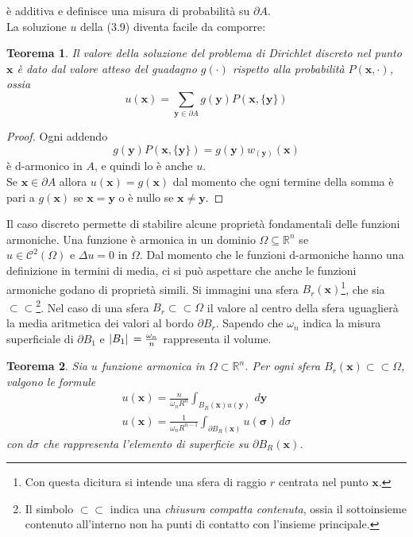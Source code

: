 \documentclass[a4paper,12pt, draft]{article}
\theoremstyle{break}
\newtheorem{theorem}{Teorema}[section]
\numberwithin{equation}{section}
\begin{document}
è additiva e definisce una misura di probabilità su \(\partial A\). \\
La soluzione \(u\) della (3.9) diventa facile da comporre:
\begin{theorem}
  Il valore della soluzione del problema di Dirichlet discreto nel punto \(\bm{x}\) è dato dal valore atteso del guadagno \(g(\cdot)\) rispetto alla probabilità \(P(\bm{x}, \cdot)\), ossia 
  \begin{equation}
    u(\bm{x}) = \sum_{\bm{y}\in \partial A} g(\bm{y})P(\bm{x}, \{\bm{y}\})
  \end{equation}
\end{theorem}
\begin{proof}
  Ogni addendo
  \[
  g(\bm{y})P(\bm{x}, \{\bm{y}\}) = g(\bm{y}) w_{(\bm{y})}(\bm{x})
  \]
  è d-armonico in \(A\), e quindi lo è anche \(u\). \\
  Se \(\bm{x} \in \partial A\) allora \(u(\bm{x}) = g(\bm{x})\) dal momento che ogni termine della somma è pari a \(g(\bm{x})\) se \(\bm{x} = \bm{y}\) o è nullo se \(\bm{x} \not = \bm{y}\).
\end{proof}
Il caso discreto permette di stabilire alcune proprietà fondamentali delle funzioni armoniche. Una funzione è armonica in un dominio \(\Omega \subseteq \mathbb{R}^n\) se \(u \in \mathcal{C}^2(\Omega) \mbox{ e }\Delta u = 0 \mbox{ in } \Omega\). Dal momento che le funzioni d-armoniche hanno una definizione in termini di media, ci si può aspettare che anche le funzioni armoniche godano di proprietà simili. Si immagini una sfera \(B_r(\bm{x})\)\footnote{Con questa dicitura si intende una sfera di raggio \(r\) centrata nel punto \(\bm{x}\).}, che sia \(\subset \subset\)\footnote{Il simbolo \(\subset \subset\) indica una \emph{chiusura compatta contenuta}, ossia il sottoinsieme contenuto all'interno non ha punti di contatto con l'insieme principale.}. Nel caso di una sfera \(B_r \subset \subset \Omega\) il valore al centro della sfera uguaglierà la media aritmetica dei valori al bordo \(\partial B_r\). Sapendo che \(\omega_n\) indica la misura superficiale di \(\partial B_1\) e \(\abs*{B_1} = \frac{\omega_n}{n}\) rappresenta il volume.
\begin{theorem}
  Sia \(u\) funzione armonica in \(\Omega \subset \mathbb{R}^n\). Per ogni sfera \(B_r(\bm{x}) \subset \subset \Omega\), valgono le formule
  \begin{eqnarray}
    u(\bm{x}) = \frac{n}{\omega_n R^n} \int_{B_R(\bm{x})u(\bm{y})} \, d\bm{y} \\
    u(\bm{x}) = \frac{1}{\omega_n R^{n-1}} \int_{\partial B_R(\bm{x})} u(\bm{\sigma}) \, d\sigma
  \end{eqnarray}
  con \(d\sigma\) che rappresenta l'elemento di superficie su \(\partial B_R(\bm{x})\).
\end{theorem}
\end{document}

